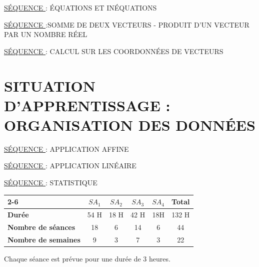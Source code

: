   \underline{SÉQUENCE } : ÉQUATIONS ET INÉQUATIONS 
  
  \underline{SÉQUENCE } :SOMME DE DEUX VECTEURS - PRODUIT D'UN VECTEUR PAR UN NOMBRE RÉEL 
  
  \underline{SÉQUENCE }: CALCUL SUR LES COORDONNÉES DE VECTEURS 
  
  \section*{SITUATION D’APPRENTISSAGE  : ORGANISATION DES DONNÉES}
  
  \underline{SÉQUENCE } : APPLICATION AFFINE
  
  \underline{SÉQUENCE } : APPLICATION LINÉAIRE
  
  \underline{SÉQUENCE } : STATISTIQUE
  
  \begin{tabular}{|l|c|c|c|c|c|}
  	\cline{2-6}
  	\multicolumn{1}{c|}{} & $SA_{1}$ & $SA_{2}$&$SA_{3}$&$SA_{4}$ &Total\\
  	\hline
  	\textbf{Durée} & 54 H& 18 H& 42 H& 18H& 132 H\\ 
  	\hline
  	\textbf{Nombre de séances} & 18 & 6& 14 & 6 &44\\
  	\hline 
  	\textbf{Nombre de semaines }& 9 & 3& 7& 3 & 22\\
  	\hline 
  \end{tabular}
  
  \vspace{0.5cm}
  Chaque séance est prévue pour une durée de 3 heures.
  
  \newpage
  \begin{center}
  	\resizebox{18cm}{0.8cm}{ \textcolor{black}{CONTRAT  DIDACTIQUE}}
  \end{center}
  
